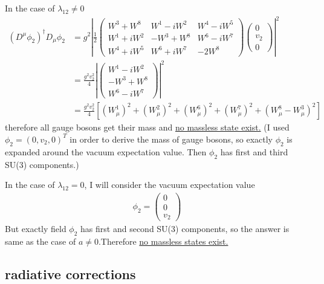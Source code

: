 In the case of $\lambda_{12}\neq0$
\begin{align*}
    (D^{\mu}\phi_2)^{\dag}D_{\mu}\phi_2&=g^2\left|\frac{1}{2}\begin{pmatrix}
        W^3+W^8&W^1-iW^2&W^4-iW^5\\
        W^1+iW^2&-W^3+W^8&W^6-iW^7\\
        W^4+iW^5&W^6+iW^7&-2W^8
    \end{pmatrix}\begin{pmatrix}
        0\\v_2\\0
    \end{pmatrix}\right|^2\\
    &=\frac{g^2v_2^2}{4}\left|\begin{pmatrix}
        W^1-iW^2\\
        -W^3+W^8\\
        W^6-iW^7
    \end{pmatrix}\right|^2\\
    &=\frac{g^2v_2^2}{4}\left[(W^1_{\mu})^2+(W^2_{\mu})^2+(W^6_{\mu})^2+(W^7_{\mu})^2+(W_{\mu}^8-W_{\mu}^3)^2\right]
\end{align*}
therefore all gauge bosons get their mass and \underline{no massless state exist.} (I used $\phi_2=(0,v_2,0)^T$ in order to derive the mass of gauge bosons, so exactly $\phi_2$ is expanded around the vacuum expectation value. Then $\phi_2$ has first and third SU(3) components.) 

In the case of $\lambda_{12}=0$, I will consider the vacuum expectation value 
\begin{align*}
    \phi_2=\begin{pmatrix}
        0\\0\\v_2
    \end{pmatrix}
\end{align*}
But exactly field $\phi_2$ has first and second SU(3) components, so the answer is same as the case of $a\neq0$.Therefore \underline{no massless states exist.}

\subsection{radiative corrections}